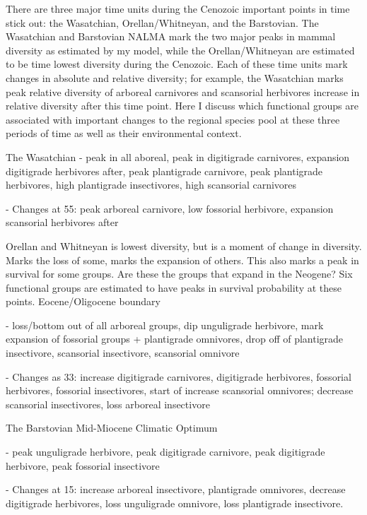 \documentclass[12pt,letterpaper]{article}
\begin{document}
There are three major time units during the Cenozoic important points in time stick out: the Wasatchian, Orellan/Whitneyan, and the Barstovian. The Wasatchian and Barstovian NALMA mark the two major peaks in mammal diversity as estimated by my model, while the Orellan/Whitneyan are estimated to be time lowest diversity during the Cenozoic. Each of these time units mark changes in absolute and relative diversity; for example, the Wasatchian marks peak relative diversity of arboreal carnivores and scansorial herbivores increase in relative diversity after this time point. Here I discuss which functional groups are associated with important changes to the regional species pool at these three periods of time as well as their environmental context.



The Wasatchian
- peak in all aboreal, peak in digitigrade carnivores, expansion digitigrade herbivores after, peak plantigrade carnivore, peak plantigrade herbivores, high plantigrade insectivores, high scansorial carnivores

- Changes at 55: peak arboreal carnivore, low fossorial herbivore, expansion scansorial herbivores after



Orellan and Whitneyan is lowest diversity, but is a moment of change in diversity. Marks the loss of some, marks the expansion of others. This also marks a peak in survival for some groups. Are these the groups that expand in the Neogene? Six functional groups are estimated to have peaks in survival probability at these points. Eocene/Oligocene boundary

- loss/bottom out of all arboreal groups, dip unguligrade herbivore, mark expansion of fossorial groups + plantigrade omnivores, drop off of plantigrade insectivore, scansorial insectivore, scansorial omnivore

- Changes as 33: increase digitigrade carnivores, digitigrade herbivores, fossorial herbivores, fossorial insectivores, start of increase scansorial omnivores; decrease scansorial insectivores, loss arboreal insectivore



The Barstovian Mid-Miocene Climatic Optimum

- peak unguligrade herbivore, peak digitigrade carnivore, peak digitigrade herbivore, peak fossorial insectivore

- Changes at 15: increase arboreal insectivore, plantigrade omnivores, decrease digitigrade herbivores, loss unguligrade omnivore, loss plantigrade insectivore.
\end{document}
